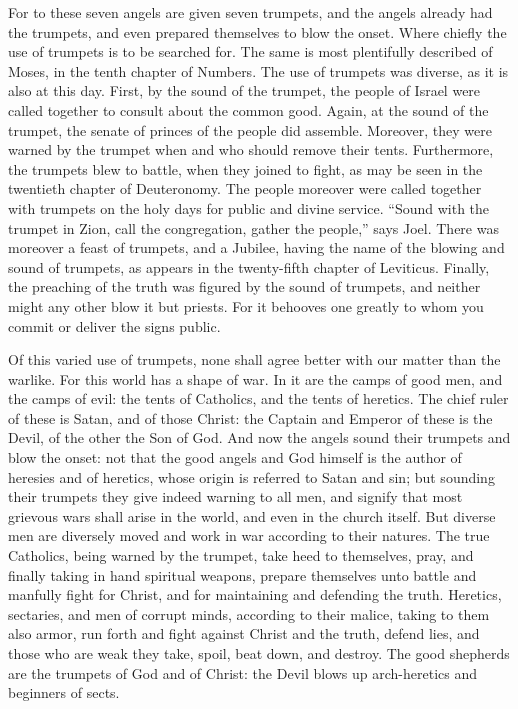 For to these seven angels are given seven trumpets, and the angels already had the trumpets, and even prepared themselves to blow the onset. Where chiefly the use of trumpets is to be searched for. The same is most plentifully described of Moses, in the tenth chapter of Numbers. The use of trumpets was diverse, as it is also at this day. First, by the sound of the trumpet, the people of Israel were called together to consult about the common good. Again, at the sound of the trumpet, the senate of princes of the people did assemble. Moreover, they were warned by the trumpet when and who should remove their tents. Furthermore, the trumpets blew to battle, when they joined to fight, as may be seen in the twentieth chapter of Deuteronomy. The people moreover were called together with trumpets on the holy days for public and divine service. “Sound with the trumpet in Zion, call the congregation, gather the people,” says Joel. There was moreover a feast of trumpets, and a Jubilee, having the name of the blowing and sound of trumpets, as appears in the twenty-fifth chapter of Leviticus. Finally, the preaching of the truth was figured by the sound of trumpets, and neither might any other blow it but priests. For it behooves one greatly to whom you commit or deliver the signs public.

Of this varied use of trumpets, none shall agree better with our matter than the warlike. For this world has a shape of war. In it are the camps of good men, and the camps of evil: the tents of Catholics, and the tents of heretics. The chief ruler of these is Satan, and of those Christ: the Captain and Emperor of these is the Devil, of the other the Son of God. And now the angels sound their trumpets and blow the onset: not that the good angels and God himself is the author of heresies and of heretics, whose origin is referred to Satan and sin; but sounding their trumpets they give indeed warning to all men, and signify that most grievous wars shall arise in the world, and even in the church itself. But diverse men are diversely moved and work in war according to their natures. The true Catholics, being warned by the trumpet, take heed to themselves, pray, and finally taking in hand spiritual weapons, prepare themselves unto battle and manfully fight for Christ, and for maintaining and defending the truth. Heretics, sectaries, and men of corrupt minds, according to their malice, taking to them also armor, run forth and fight against Christ and the truth, defend lies, and those who are weak they take, spoil, beat down, and destroy. The good shepherds are the trumpets of God and of Christ: the Devil blows up arch-heretics and beginners of sects.

